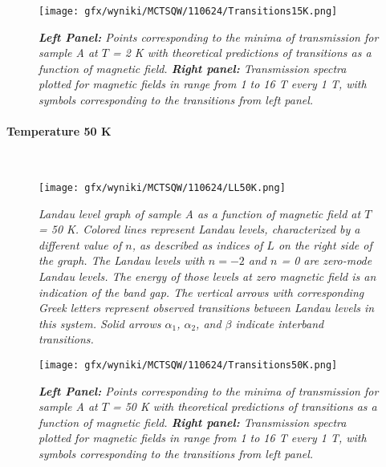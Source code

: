 \documentclass[titlepage,a4paper]{book}
\newcommand{\wciecie}{\quad\phantom{v}}
\newcommand{\myparagraph}[1]{\paragraph{#1}\mbox{}\\}
\begin{document}
\begin{figure}[H]
	\centering
	\texttt{[image: gfx/wyniki/MCTSQW/110624/Transitions15K.png]}
	\vspace{-10pt}
	\caption{\textit{\textbf{Left Panel:} Points corresponding to the minima of transmission for sample A at $T$ = 2 K with theoretical predictions of transitions as a function of magnetic field. \textbf{Right panel:} Transmission spectra plotted for magnetic fields in range from 1 to 16 T every 1 T, with symbols corresponding to the transitions from left panel.}}
	\label{fig:Transitions_110624_15K}
\end{figure}


\myparagraph{Temperature 50 K}
\wciecie
\begin{figure}[H]
	\centering
	\texttt{[image: gfx/wyniki/MCTSQW/110624/LL50K.png]}
	\vspace{-10pt}
	\caption{\textit{Landau level graph of sample A as a function of magnetic field at $T$ = 50 K. Colored lines represent Landau levels, characterized by a different value of $n$, as described as indices of $L$ on the right side of the graph. The Landau levels with $n = -2$ and $n$ = 0 are zero-mode Landau levels. The energy of those levels at zero magnetic field is an indication of the band gap. The vertical arrows with corresponding Greek letters represent observed transitions between Landau levels in this system. Solid arrows $\alpha_1$, $\alpha_2$, and $\beta$ indicate interband transitions.}}
	\label{fig:LL_110624_50K}
\end{figure}

\begin{figure}[H]
	\centering
	\texttt{[image: gfx/wyniki/MCTSQW/110624/Transitions50K.png]}
	\vspace{-10pt}
	\caption{\textit{\textbf{Left Panel:} Points corresponding to the minima of transmission for sample A at $T$ = 50 K with theoretical predictions of transitions as a function of magnetic field. \textbf{Right panel:} Transmission spectra plotted for magnetic fields in range from 1 to 16 T every 1 T, with symbols corresponding to the transitions from left panel.}}
	\label{fig:Transitions_110624_50K}
\end{figure}
\end{document}
